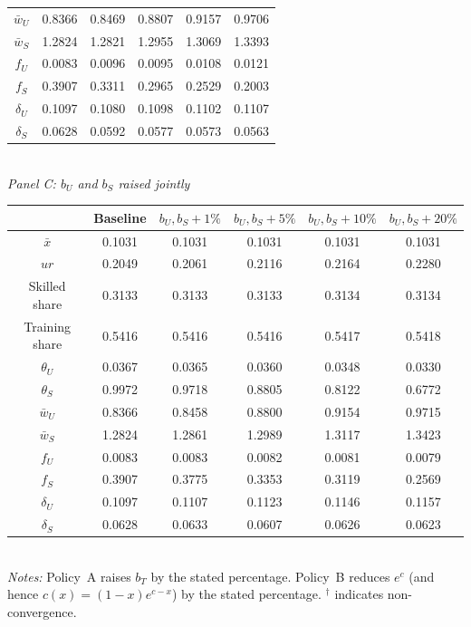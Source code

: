 \begin{table}[htbp]
\begin{tabular}{c c c c c c}
\(\bar{w}_U\) & 0.8366 & 0.8469 & 0.8807 & 0.9157 & 0.9706 \\
\(\bar{w}_S\) & 1.2824 & 1.2821 & 1.2955 & 1.3069 & 1.3393 \\
\(f_U\) & 0.0083 & 0.0096 & 0.0095 & 0.0108 & 0.0121 \\
\(f_S\) & 0.3907 & 0.3311 & 0.2965 & 0.2529 & 0.2003 \\
\(\delta_U\) & 0.1097 & 0.1080 & 0.1098 & 0.1102 & 0.1107 \\
\(\delta_S\) & 0.0628 & 0.0592 & 0.0577 & 0.0573 & 0.0563 \\
\bottomrule
\end{tabular}
\\[10pt]
\textit{Panel C: \(b_U\) and \(b_S\) raised jointly}
\\[4pt]
\begin{tabular}{c c c c c c}
\toprule
  & Baseline & $b_U,b_S +1\%$ & $b_U,b_S +5\%$ & $b_U,b_S +10\%$ & $b_U,b_S +20\%$ \\
\midrule
\(\bar{x}\) & 0.1031 & 0.1031 & 0.1031 & 0.1031 & 0.1031 \\
\(ur\) & 0.2049 & 0.2061 & 0.2116 & 0.2164 & 0.2280 \\
Skilled share & 0.3133 & 0.3133 & 0.3133 & 0.3134 & 0.3134 \\
Training share & 0.5416 & 0.5416 & 0.5416 & 0.5417 & 0.5418 \\
\(\theta_U\) & 0.0367 & 0.0365 & 0.0360 & 0.0348 & 0.0330 \\
\(\theta_S\) & 0.9972 & 0.9718 & 0.8805 & 0.8122 & 0.6772 \\
\(\bar{w}_U\) & 0.8366 & 0.8458 & 0.8800 & 0.9154 & 0.9715 \\
\(\bar{w}_S\) & 1.2824 & 1.2861 & 1.2989 & 1.3117 & 1.3423 \\
\(f_U\) & 0.0083 & 0.0083 & 0.0082 & 0.0081 & 0.0079 \\
\(f_S\) & 0.3907 & 0.3775 & 0.3353 & 0.3119 & 0.2569 \\
\(\delta_U\) & 0.1097 & 0.1107 & 0.1123 & 0.1146 & 0.1157 \\
\(\delta_S\) & 0.0628 & 0.0633 & 0.0607 & 0.0626 & 0.0623 \\
\bottomrule
\end{tabular}
\\[2pt]
\footnotesize
\textit{Notes:} Policy~A raises \(b_T\) by the stated percentage. Policy~B reduces \(e^c\) (and hence \(c(x) = (1-x)e^{c-x}\)) by the stated percentage. \(^{\dagger}\) indicates non-convergence.
\end{table}
